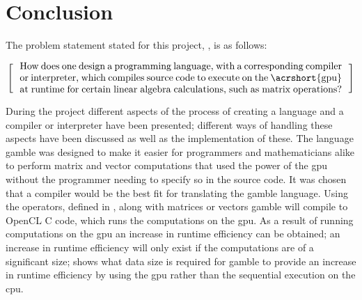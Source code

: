 \chapter{Conclusion} %
\label{cha:conclusion}
The problem statement stated for this project, , is as follows:

\[
  \left[
  \begin{minipage}{\textwidth}
  \centering
  \begin{minipage}{0.96\textwidth}
  How does one design a programming language, with a corresponding compiler or interpreter, which compiles source code to execute on the \acrshort{gpu} at runtime for certain linear algebra calculations, such as matrix operations?
  \end{minipage}
  \end{minipage}
    \right]
\]

During the project different aspects of the process of creating a language and a compiler or interpreter have been presented; different ways of handling these aspects have been discussed as well as the implementation of these.
The language \gls{gamble} was designed to make it easier for programmers and mathematicians alike to perform matrix and vector computations that used the power of the \acrshort{gpu} without the programmer needing to specify so in the source code.
It was chosen that a compiler would be the best fit for translating the \gls{gamble} language.
Using the operators, defined in , along with matrices or vectors \gls{gamble} will compile to OpenCL C code, which runs the computations on the \acrshort{gpu}.
As a result of running computations on the \acrshort{gpu} an increase in runtime efficiency can be obtained; an increase in runtime efficiency will only exist if the computations are of a significant size;  shows what data size is required for \gls{gamble} to provide an increase in runtime efficiency by using the \acrshort{gpu} rather than the sequential execution on the \acrshort{cpu}.

